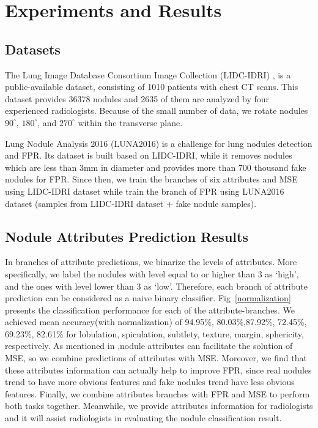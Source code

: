 \documentclass[runningheads]{llncs}
\begin{document}
\section{Experiments and Results}
\label{exp}
\subsection{Datasets}
The Lung Image Database Consortium Image Collection (LIDC-IDRI) \cite{Armato2010WE}, is a public-available dataset, consisting of 1010 patients with chest CT scans. This dataset provides 36378 nodules and 2635 of them are analyzed by four experienced radiologists. Because of the small number of data, we rotate nodules $90^{\circ}$, $180^{\circ}$, and $270^{\circ}$ within the transverse plane.

Lung Nodule Analysis 2016 (LUNA2016) \cite{Aaa2016Validation} is a challenge for lung nodules detection and FPR. Its dataset is built based on LIDC-IDRI, while it removes nodules which are less than 3mm in diameter and provides more than 700 thousand fake nodules for FPR. Since then, we train the branches of six attributes and MSE using LIDC-IDRI dataset while train the branch of FPR using LUNA2016 dataset (samples from LIDC-IDRI dataset + fake nodule samples).


\subsection{Nodule Attributes Prediction Results}
In branches of attribute predictions, we binarize the levels of attributes. More specifically, we label the nodules with level equal to or higher than 3 as `high', and the ones with level lower than 3 as `low'. Therefore, each branch of attribute prediction can be considered as a naive binary classifier.
Fig~\ref{normalization} presents the classification performance for each of the attribute-branches. We achieved mean accuracy(with normalization) of 94.95\%, 80.03\%,87.92\%, 72.45\%, 69.23\%, 82.61\% for lobulation, spiculation, subtlety, texture, margin, sphericity, respectively. As mentioned in \cite{Hussein2017Risk},nodule attributes can facilitate the solution of MSE, so we combine predictions of attributes with MSE. Moreover, we find that these attributes information can actually help to improve FPR, since real nodules trend to have more obvious features and fake nodules trend have less obvious features. Finally, we combine attributes branches with FPR and MSE to perform both tasks together.
Meanwhile, we provide attributes information for radiologists and it will assist radiologists in evaluating the nodule classification result.
\end{document}
